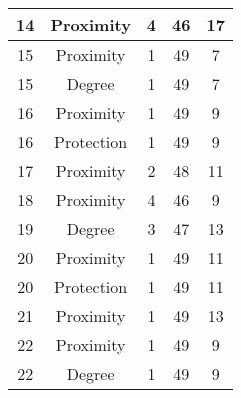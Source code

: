 \documentclass[results.tex]{subfiles}
\begin{document}
\begin{center}
\begin{tabular}{| c || c | c | c | c |}
            \hline
            14                      & Proximity                    & 4                      & 46                      & 17                   \\
            \hline
            15                      & Proximity                    & 1                      & 49                      & 7                    \\
            \hline
            15                      & Degree                       & 1                      & 49                      & 7                    \\
            \hline
            16                      & Proximity                    & 1                      & 49                      & 9                    \\
            \hline
            16                      & Protection                   & 1                      & 49                      & 9                    \\
            \hline
            17                      & Proximity                    & 2                      & 48                      & 11                   \\
            \hline
            18                      & Proximity                    & 4                      & 46                      & 9                    \\
            \hline
            19                      & Degree                       & 3                      & 47                      & 13                   \\
            \hline
            20                      & Proximity                    & 1                      & 49                      & 11                   \\
            \hline
            20                      & Protection                   & 1                      & 49                      & 11                   \\
            \hline
            21                      & Proximity                    & 1                      & 49                      & 13                   \\
            \hline
            22                      & Proximity                    & 1                      & 49                      & 9                    \\
            \hline
            22                      & Degree                       & 1                      & 49                      & 9                    \\

\end{tabular}
\end{center}
\end{document}
